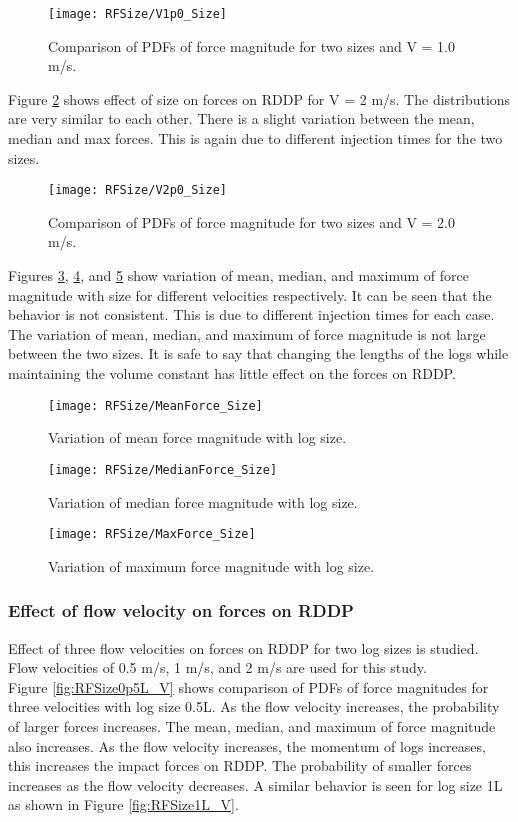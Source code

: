 \begin{figure}
\centering
\texttt{[image: RFSize/V1p0\_Size]}
\caption{\label{fig:RFSV1p0}Comparison of PDFs of force magnitude for two sizes and V = 1.0 m/s.}
\end{figure} 

\noindent Figure \ref{fig:RFSV2p0} shows effect of size on forces on RDDP for V = 2 m/s. The distributions are very similar to each other. There is a slight variation between the mean, median and max forces. This is again due to different injection times for the two sizes. 

\begin{figure}
\centering
\texttt{[image: RFSize/V2p0\_Size]}
\caption{\label{fig:RFSV2p0}Comparison of PDFs of force magnitude for two sizes and V = 2.0 m/s.}
\end{figure} 

\noindent Figures \ref{fig:RFMeanForce_Size}, \ref{fig:RFMedianForce_Size}, and \ref{fig:RFMaxForce_Size} show variation of mean, median, and maximum of force magnitude with size for different velocities respectively. It can be seen that the behavior is not consistent. This is due to different injection times for each case. The variation of mean, median, and maximum of force magnitude is not large between the two sizes. It is safe to say that changing the lengths of the logs while maintaining the volume constant has little effect on the forces on RDDP. 

\begin{figure}
\centering
\texttt{[image: RFSize/MeanForce\_Size]}
\caption{\label{fig:RFMeanForce_Size}Variation of mean force magnitude with log size.}
\end{figure} 
\begin{figure}
\centering
\texttt{[image: RFSize/MedianForce\_Size]}
\caption{\label{fig:RFMedianForce_Size}Variation of median force magnitude with log size.}
\end{figure} 
\begin{figure}
\centering
\texttt{[image: RFSize/MaxForce\_Size]}
\caption{\label{fig:RFMaxForce_Size}Variation of maximum force magnitude with log size.}
\end{figure} 
\FloatBarrier
\subsubsection{Effect of flow velocity on forces on RDDP}
Effect of three flow velocities on forces on RDDP  for two log sizes is studied. Flow velocities of 0.5 m/s, 1 m/s, and 2 m/s are used for this study.\\
Figure \ref{fig:RFSize0p5L_V} shows comparison of PDFs of force magnitudes for three velocities with log size 0.5L. As the flow velocity increases, the probability of larger forces increases. The mean, median, and maximum of force magnitude also increases. As the flow velocity increases, the momentum of logs increases, this increases the impact forces on RDDP. The probability of smaller forces increases as the flow velocity decreases. A similar behavior is seen for log size 1L as shown in Figure \ref{fig:RFSize1L_V}.

